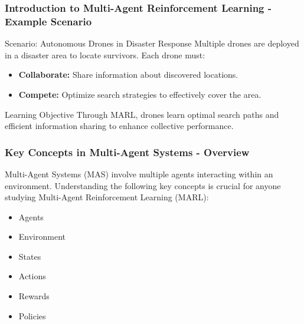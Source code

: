 \documentclass[aspectratio=169]{beamer}
\begin{document}
\begin{frame}[fragile]
    \frametitle{Introduction to Multi-Agent Reinforcement Learning - Example Scenario}
    \begin{block}{Scenario: Autonomous Drones in Disaster Response}
        Multiple drones are deployed in a disaster area to locate survivors. Each drone must:
        \begin{itemize}
            \item \textbf{Collaborate:} Share information about discovered locations.
            \item \textbf{Compete:} Optimize search strategies to effectively cover the area.
        \end{itemize}
    \end{block}

    \begin{block}{Learning Objective}
        Through MARL, drones learn optimal search paths and efficient information sharing to enhance collective performance.
    \end{block}
\end{frame}

\begin{frame}[fragile]
    \frametitle{Key Concepts in Multi-Agent Systems - Overview}
    Multi-Agent Systems (MAS) involve multiple agents interacting within an environment. Understanding the following key concepts is crucial for anyone studying Multi-Agent Reinforcement Learning (MARL):
    \begin{itemize}
        \item Agents
        \item Environment
        \item States
        \item Actions
        \item Rewards
        \item Policies
    \end{itemize}
\end{frame}
\end{document}
